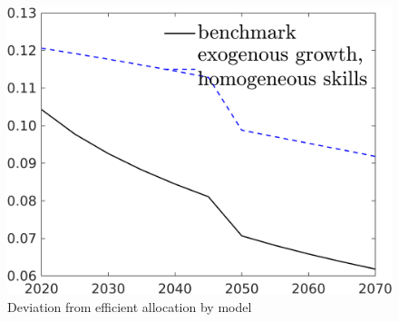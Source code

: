 \begin{figure}[h!!]
	\centering
	\caption{Deviation from efficient allocation by model }\label{fig:comp_mod_pol}
	\begin{minipage}[]{0.32\textwidth}
		\includegraphics[width=1\textwidth]{../../codding_model/own_basedOnFried/optimalPol_190722_tidiedUp/figures/all_10Aout22/CompMod_xgr_nsk_OPT_T_NoTaus_taul_regime3_spillover0_noskill0_sep1_xgrowth0_extern0_PV1_etaa0.79_lgd1.png}
	\end{minipage}
\end{figure}


